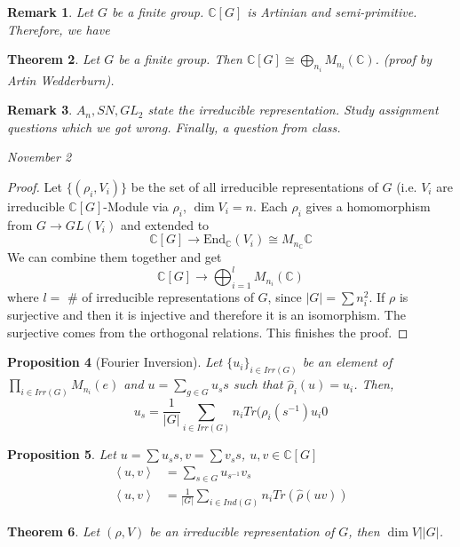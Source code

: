\documentclass[letterpaper, leqno, 12pt]{article}
\newcommand{\fin}{\qquad \quad \hfill \framebox[1.75mm][l]{\,}}
\newcommand{\End}{\mbox{End}}
\providecommand{\ip}[1]{\left\langle #1 \right\rangle}
\newcommand{\bC} {\mathbb{C}}
\newcommand {\repV} {(\rho,V)}
\theoremstyle{stdthm}
\newtheorem{thm}{Theorem}
\newtheorem{prop}[thm]{Proposition}
\theoremstyle{stddef}
\newtheorem{rem}[thm]{Remark} %
\theoremstyle{stdnonum}
\theoremstyle{stdqands}
\theoremstyle{stdbold}
\begin{document}
\begin{rem}
Let $G$ be a finite group. $\bC[G]$ is Artinian and semi-primitive. Therefore, we have
\end{rem}

\begin{thm}
Let $G$ be a finite group. Then $\bC[G] \cong \bigoplus_{n_i} M_{n_i} (\bC)$. (proof by Artin Wedderburn). 
\end{thm}

\begin{rem}
$A_n, SN, GL_2$ state the irreducible representation. Study assignment questions which we got wrong. Finally, a question from class. 
\end{rem}

\begin{center}
\emph{November 2}
\end{center}
\begin{proof}
Let $\{(\rho_i,V_i)\}$ be the set of all irreducible representations of $G$ (i.e. $V_i$ are irreducible $\bC[G]$-Module via $\rho_i$, $\dim V_i = n$. Each $\rho_i$ gives a homomorphism from $G \rightarrow GL(V_i)$ and extended to 
\[ \bC[G] \rightarrow \End_\bC(V_i) \cong M_{n_\bC} \bC \]
We can combine them together and get 
\[ \bC[G] \rightarrow \bigoplus_{i=1}^l M_{n_i}(\bC)\]
where $l = $ \# of irreducible representations of $G$, since $|G| = \sum n_i^2$. If $\rho$ is surjective and then it is injective and therefore it is an isomorphism. The surjective comes from the orthogonal relations. This finishes the proof. 
\end{proof}

\begin{prop} [Fourier Inversion]
Let $\{u_i\}_{i \in Irr(G)}$ be an element of $\prod_{ i \in Irr(G)} M_{n_i}(e)$ and $u = \sum_{g \in G} u_s s$ such that $\hat{\rho}_i(u) = u_i$. Then, 
\[ u_s = \frac{1}{|G|} \sum_{i \in Irr(G)} n_i Tr(\rho_i(s^{-1}) u_i0 \]
\end{prop}

\begin{prop}
Let $u = \sum u_s s, v = \sum v_s s$, $u,v \in \bC[G]$
\begin{align*}
\ip{u,v} &= \sum_{s\in G} u_{s^{-1}} v_s \\
\ip{u,v} &= \frac{1}{|G|} \sum_{i \in Ind(G)} n_i Tr(\hat{\rho} (uv))
\end{align*}
\end{prop}

\begin{thm}
Let $\repV$ be an irreducible representation of $G$, then $\dim V||G|$.
\end{thm}
\end{document}
